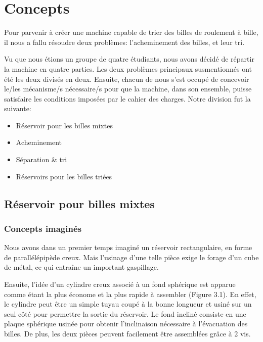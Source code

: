 \chapter{Concepts}
Pour parvenir à créer une machine capable de trier des billes de roulement à bille, il nous a fallu résoudre deux problèmes: l'acheminement des billes, et leur tri.


Vu que nous étions un groupe de quatre étudiants, nous avons décidé de répartir la machine en quatre parties. Les deux problèmes principaux susmentionnés ont été les deux divisés en deux. Ensuite, chacun de nous s'est occupé de concevoir le/les mécanisme/s nécessaire/s pour que la machine, dans son ensemble, puisse satisfaire les conditions imposées par le cahier des charges. Notre division fut la suivante:
\begin{itemize}
    \item Réservoir pour les billes mixtes
    \item Acheminement
    \item Séparation \& tri
    \item Réservoirs pour les billes triées
\end{itemize}

\section{Réservoir pour billes mixtes}

\subsection{Concepts imaginés}
Nous avons dans un premier temps imaginé un réservoir rectangulaire, en forme de parallélépipède creux. Mais l’usinage d’une telle pièce exige le forage d’un cube de métal, ce qui entraîne un important gaspillage.

Ensuite, l’idée d’un cylindre creux associé à un fond sphérique est apparue comme étant la plus économe et la plus rapide à assembler (Figure 3.1). En effet, le cylindre peut être un simple tuyau coupé à la bonne longueur et usiné sur un seul côté pour permettre la sortie du réservoir. Le fond incliné consiste en une plaque sphérique usinée pour obtenir l'inclinaison nécessaire à l'évacuation des billes. De plus, les deux pièces peuvent facilement être assemblées grâce à 2 vis.

